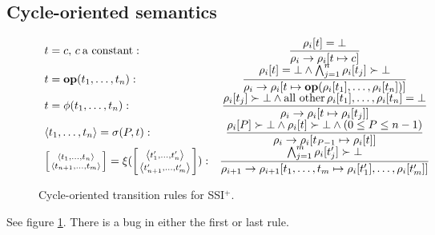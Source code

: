 \documentclass[12pt,notitlepage,twoside]{article}
\newenvironment{transitions}{
 \newcommand{\isdef}[1]{\ensuremath{##1\:\mbox{defined}}}
 \newcommand{\notdef}[1]{\ensuremath{##1\:\mbox{undefined}}}
 \newcommand{\trule}[2]{\ensuremath{\displaystyle\frac{##1}{##2}}}
 \renewcommand{\arraystretch}{2.5}
 \newcommand{\myarray}[2]{\renewcommand{\arraystretch}{1}\begin{array}{##1}##2\end{array}\renewcommand{\arraystretch}{2.5}}
 \begin{center}\begin{math}\begin{array}{lc}}
{\end{array}\end{math}\end{center}\renewcommand{\arraystretch}{1}}
\newcommand{\tuple}[1]{\ensuremath{\left\langle #1 \right\rangle}}
\newcommand{\xivec}[2]{\ensuremath{\left[\tuple{#1}\atop\tuple{#2}\right]}}
\newcommand{\ssiplus}{SSI$^+$}
\begin{document}
\subsection{Cycle-oriented semantics}
\begin{figure}[t]
\begin{transitions}
t=c,\,c\:\mbox{a constant}:
& \trule{\rho_i[t]=\bot}{\rho_i \to \rho_i[t \mapsto c]} \\
t=\mathbf{op}(t_1,\ldots,t_n):
& \trule{\rho_i[t]=\bot \wedge \bigwedge_{j=1}^n \rho_i[t_j]\succ\bot}
        {\rho_i \to \rho_i[t \mapsto \mathbf{op}(\rho_i[t_1],\ldots,\rho_i[t_n])]} \\
t=\phi(t_1,\ldots,t_n):
& \trule{\rho_i[t_j]\succ\bot \wedge \mbox{all other}\,\rho_i[t_1],\ldots,\rho_i[t_n]=\bot}
        {\rho_i \to \rho_i[t \mapsto \rho_i[t_j]]} \\
\tuple{t_1,\ldots,t_n}=\sigma(P,t):
& \trule{\rho_i[P]\succ\bot \wedge \rho_i[t]\succ\bot \wedge (0\leq P\leq n-1)}
        {\rho_i \to \rho_i[t_{P-1} \mapsto \rho_i[t]]} \\
\xivec{t_1,\ldots,t_n}{t_{n+1},\ldots,t_{m}}=\xi(\xivec{t'_1,\ldots,t'_n}{t'_{n+1},\ldots,t'_m}):
& \trule{\bigwedge_{j=1}^m \rho_i[t'_j]\succ\bot}{\rho_{i+1} \to \rho_{i+1}[t_1,\ldots,t_m \mapsto \rho_i[t'_1],\ldots,\rho_i[t'_m]]} \\
\end{transitions}
\caption{Cycle-oriented transition rules for \ssiplus.}
\label{fig:cyclesemantics}
\end{figure}
See figure \ref{fig:cyclesemantics}.  There is a bug in either the
first or last rule.
\end{document}
